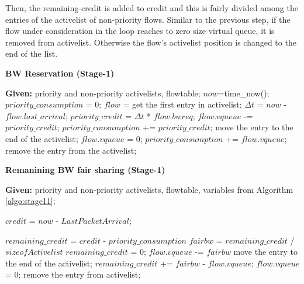 \documentclass[conference]{IEEEtran}
\begin{document}
Then, the remaining-credit is added to credit and this is fairly divided among the entries of the activelist of non-priority flows. Similar to the previous step, if the flow under consideration in the loop reaches to zero size virtual queue, it is removed from activelist. Otherwise the flow's activelist position is changed to the end of the list.

\begin{algorithm}
\caption{\textbf{BW Reservation (Stage-1)}}
\label {algo:stage11}
\begin{algorithmic}[1]
\STATE \textbf{Given:} priority and non-priority activelists, flowtable;
\STATE $now$=time\_now();
\STATE $priority\_consumption$ = 0;
\STATE $flow$ = get the first entry in activelist;
\STATE $\Delta t$ = $now$ - $flow.last\_arrival$;
\STATE $priority\_credit$ = $\Delta t$ * $flow.bwreq$;
\STATE $flow.vqueue$ -= $priority\_credit$;
\STATE $priority\_consumption$ += $priority\_credit$;
\STATE move the entry to the end of the activelist;
\ELSE 
\STATE $flow.vqueue$ = 0;
\STATE $priority\_consumption$ += $flow.vqueue$;
\STATE remove the entry from the activelist;
\ENDIF
\ENDFOR
\ENDIF
\end{algorithmic}
\end{algorithm}

\begin{algorithm}
\caption{\textbf{Remanining BW fair sharing (Stage-1)}}
\label {algo:stage12}
\begin{algorithmic}[1]
\STATE \textbf{Given:} priority and non-priority activelists, flowtable, variables from Algorithm \ref{algo:stage11};

\STATE $credit$ = $now$ - $Last Packet Arrival$;

\STATE $remaining\_credit$ = $credit$ - $priority\_consumption$
\STATE $fairbw$ = $remaining\_credit$ / $sizeofActivelist$
\STATE $remaining\_credit$ = 0;
\STATE $flow.vqueue$ -= $fairbw$
\STATE move the entry to the end of the activelist;
\ELSE
\STATE $remaining\_credit$ += $fairbw$ - $flow.vqueue$;
\STATE $flow.vqueue$ = 0;
\STATE remove the entry from activelist;
\ENDIF
\ENDFOR
\ENDWHILE
\ENDIF

\end{algorithmic}
\end{algorithm}
\end{document}

